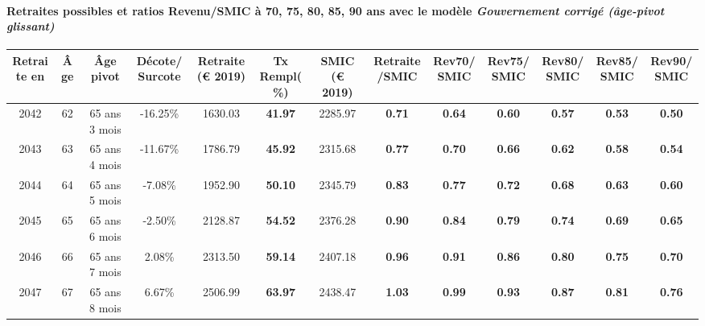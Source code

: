 \paragraph{Retraites possibles et ratios Revenu/SMIC à 70, 75, 80, 85, 90 ans avec le modèle \emph{Gouvernement corrigé (âge-pivot glissant)}}  
 
{ \scriptsize \begin{center} 
\begin{tabular}[htb]{|c|c||c|c||c|c||c||c|c|c|c|c|c|} 
\hline 
 Retraite en &  Âge &  Âge pivot &  Décote/Surcote &  Retraite (\euro{} 2019) &  Tx Rempl(\%) &  SMIC (\euro{} 2019) &  Retraite/SMIC &  Rev70/SMIC &  Rev75/SMIC &  Rev80/SMIC &  Rev85/SMIC &  Rev90/SMIC \\ 
\hline \hline 
 2042 &  62 &  65 ans 3 mois &  -16.25\% &  1630.03 &  {\bf 41.97} &  2285.97 &  {\bf {\color{red} 0.71}} &  {\bf {\color{red} 0.64}} &  {\bf {\color{red} 0.60}} &  {\bf {\color{red} 0.57}} &  {\bf {\color{red} 0.53}} &  {\bf {\color{red} 0.50}} \\ 
\hline 
 2043 &  63 &  65 ans 4 mois &  -11.67\% &  1786.79 &  {\bf 45.92} &  2315.68 &  {\bf {\color{red} 0.77}} &  {\bf {\color{red} 0.70}} &  {\bf {\color{red} 0.66}} &  {\bf {\color{red} 0.62}} &  {\bf {\color{red} 0.58}} &  {\bf {\color{red} 0.54}} \\ 
\hline 
 2044 &  64 &  65 ans 5 mois &  -7.08\% &  1952.90 &  {\bf 50.10} &  2345.79 &  {\bf {\color{red} 0.83}} &  {\bf {\color{red} 0.77}} &  {\bf {\color{red} 0.72}} &  {\bf {\color{red} 0.68}} &  {\bf {\color{red} 0.63}} &  {\bf {\color{red} 0.60}} \\ 
\hline 
 2045 &  65 &  65 ans 6 mois &  -2.50\% &  2128.87 &  {\bf 54.52} &  2376.28 &  {\bf {\color{red} 0.90}} &  {\bf {\color{red} 0.84}} &  {\bf {\color{red} 0.79}} &  {\bf {\color{red} 0.74}} &  {\bf {\color{red} 0.69}} &  {\bf {\color{red} 0.65}} \\ 
\hline 
 2046 &  66 &  65 ans 7 mois &  2.08\% &  2313.50 &  {\bf 59.14} &  2407.18 &  {\bf {\color{red} 0.96}} &  {\bf {\color{red} 0.91}} &  {\bf {\color{red} 0.86}} &  {\bf {\color{red} 0.80}} &  {\bf {\color{red} 0.75}} &  {\bf {\color{red} 0.70}} \\ 
\hline 
 2047 &  67 &  65 ans 8 mois &  6.67\% &  2506.99 &  {\bf 63.97} &  2438.47 &  {\bf 1.03} &  {\bf {\color{red} 0.99}} &  {\bf {\color{red} 0.93}} &  {\bf {\color{red} 0.87}} &  {\bf {\color{red} 0.81}} &  {\bf {\color{red} 0.76}} \\ 
\hline 
\hline 
\end{tabular} 
\end{center} } 
